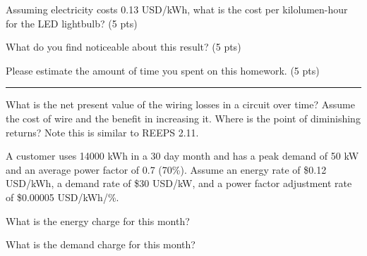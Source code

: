 \documentclass{article}
\begin{document}
\subproblem Assuming electricity costs 0.13 USD/kWh, what is the cost per
kilolumen-hour for the LED lightbulb? (5 pts)

\subproblem What do you find noticeable about this result? (5 pts)




Please estimate the amount of time you spent on this homework. (5 pts)


\newpage
\setcounter{problem}{0}
\setcounter{page}{1}
\hrule
\vspace{10pt}

What is the net present value of the wiring losses in a circuit over
time?  Assume the cost of wire and the benefit in increasing it.  Where
is the point of diminishing returns?  Note this is similar to REEPS
2.11.






A customer uses 14000 kWh in a 30 day month and has a peak demand of 50 kW and an
average power factor of 0.7 (70\%).  Assume an energy rate of \$0.12 USD/kWh, a
demand rate of \$30 USD/kW, and a power factor adjustment rate of
\$0.00005 USD/kWh/\%.

\subproblem
What is the energy charge for this month?


\subproblem
What is the demand charge for this month?


\end{document}
